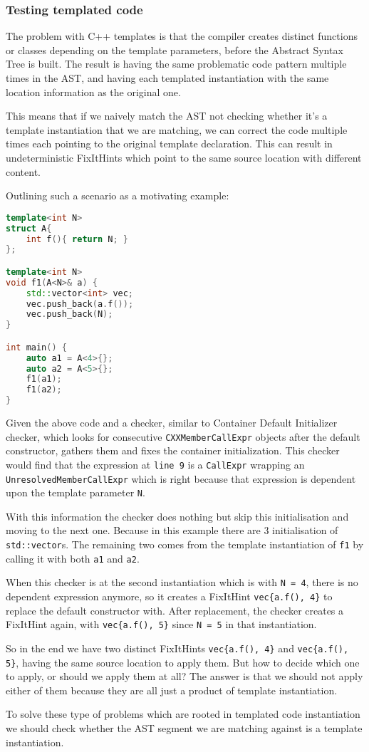 \subsubsection{Testing templated code}
\par The problem with C++ templates is that the compiler creates distinct functions or classes depending on the template parameters, before the Abstract Syntax Tree is built. The result is having the same problematic code pattern multiple times in the AST, and having each templated instantiation with the same location information as the original one. \medskip
\par This means that if we naively match the AST not checking whether it's a template instantiation that we are matching, we can correct the code multiple times each pointing to the original template declaration. This can result in undeterministic FixItHints which point to the same source location with different content.  \pagebreak
\par Outlining such a scenario as a motivating example: 
\begin{lstlisting}[language=c++, frame=single]
template<int N>
struct A{
	int f(){ return N; }
};

template<int N>
void f1(A<N>& a) {
	std::vector<int> vec;
	vec.push_back(a.f());
	vec.push_back(N);
}

int main() {
	auto a1 = A<4>{};
	auto a2 = A<5>{};
	f1(a1);
	f1(a2);
}
\end{lstlisting}
Given the above code and a checker, similar to Container Default Initializer checker, which looks for consecutive \verb|CXXMemberCallExpr| objects after the default constructor, gathers them and fixes the container initialization. This checker would find that the expression at \verb|line 9| is a \verb|CallExpr| wrapping an \verb|UnresolvedMemberCallExpr| which is right because that expression is dependent upon the template parameter \verb|N|. \medskip
\par With this information the checker does nothing but skip this initialisation and moving to the next one. Because in this example there are 3 initialisation of \verb|std::vector|s. The remaining two comes from the template instantiation of \verb|f1| by calling it with both \verb|a1| and \verb|a2|. \medskip
\par When this checker is at the second instantiation which is with \verb|N = 4|, there is no dependent expression anymore, so it creates a FixItHint \verb|vec{a.f(), 4}| to replace the default constructor with. After replacement, the checker creates a FixItHint again, with \verb|vec{a.f(), 5}| since \verb|N = 5| in that instantiation. \medskip
\par So in the end we have two distinct FixItHints  \verb|vec{a.f(), 4}| and  \verb|vec{a.f(), 5}|, having the same source location to apply them. But how to decide which one to apply, or should we apply them at all? The answer is that we should not apply either of them because they are all just a product of template instantiation.  \medskip
\par To solve these type of problems which are rooted in templated code instantiation we should check whether the AST segment we are matching against is a template instantiation.
